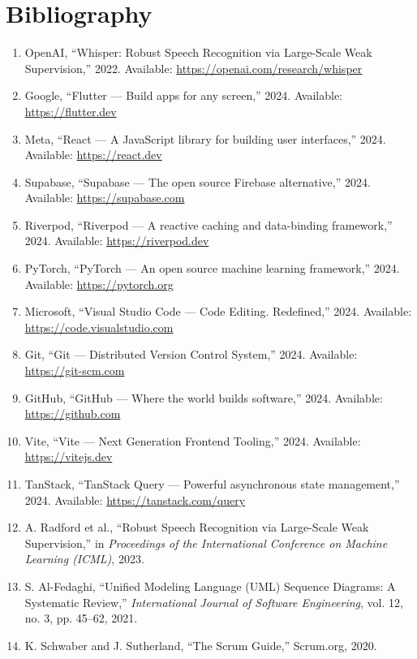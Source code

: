 \chapter*{Bibliography}

\begin{enumerate}
  \item OpenAI, ``Whisper: Robust Speech Recognition via Large-Scale Weak Supervision,'' 2022. Available: \url{https://openai.com/research/whisper}

  \item Google, ``Flutter --- Build apps for any screen,'' 2024. Available: \url{https://flutter.dev}

  \item Meta, ``React --- A JavaScript library for building user interfaces,'' 2024. Available: \url{https://react.dev}

  \item Supabase, ``Supabase --- The open source Firebase alternative,'' 2024. Available: \url{https://supabase.com}

  \item Riverpod, ``Riverpod --- A reactive caching and data-binding framework,'' 2024. Available: \url{https://riverpod.dev}

  \item PyTorch, ``PyTorch --- An open source machine learning framework,'' 2024. Available: \url{https://pytorch.org}

  \item Microsoft, ``Visual Studio Code --- Code Editing. Redefined,'' 2024. Available: \url{https://code.visualstudio.com}

  \item Git, ``Git --- Distributed Version Control System,'' 2024. Available: \url{https://git-scm.com}

  \item GitHub, ``GitHub --- Where the world builds software,'' 2024. Available: \url{https://github.com}

  \item Vite, ``Vite --- Next Generation Frontend Tooling,'' 2024. Available: \url{https://vitejs.dev}

  \item TanStack, ``TanStack Query --- Powerful asynchronous state management,'' 2024. Available: \url{https://tanstack.com/query}

  \item A. Radford et al., ``Robust Speech Recognition via Large-Scale Weak Supervision,'' in \textit{Proceedings of the International Conference on Machine Learning (ICML)}, 2023.

  \item S. Al-Fedaghi, ``Unified Modeling Language (UML) Sequence Diagrams: A Systematic Review,'' \textit{International Journal of Software Engineering}, vol. 12, no. 3, pp. 45--62, 2021.

  \item K. Schwaber and J. Sutherland, ``The Scrum Guide,'' Scrum.org, 2020.
\end{enumerate}
